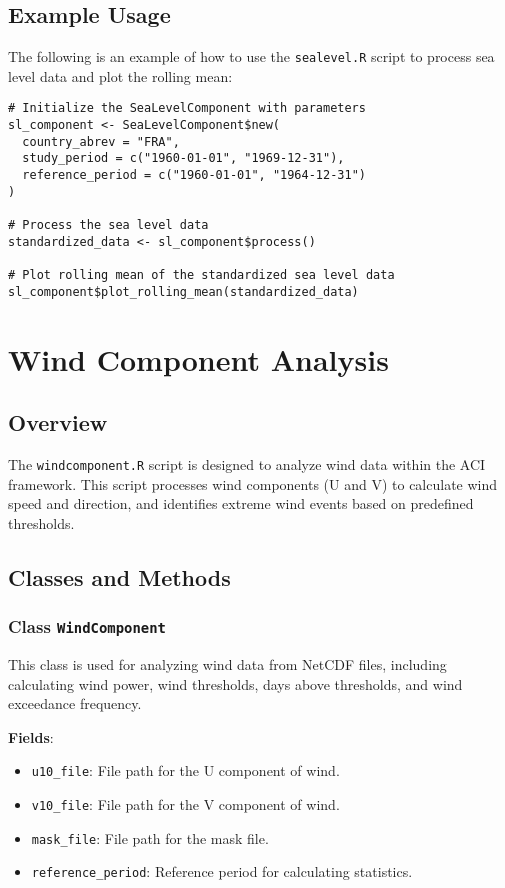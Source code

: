 \documentclass[a4paper,12pt]{article}
\begin{document}
\subsection{Example Usage}
The following is an example of how to use the \texttt{sealevel.R} script to process sea level data and plot the rolling mean:

\begin{verbatim}
# Initialize the SeaLevelComponent with parameters
sl_component <- SeaLevelComponent$new(
  country_abrev = "FRA",
  study_period = c("1960-01-01", "1969-12-31"),
  reference_period = c("1960-01-01", "1964-12-31")
)

# Process the sea level data
standardized_data <- sl_component$process()

# Plot rolling mean of the standardized sea level data
sl_component$plot_rolling_mean(standardized_data)
\end{verbatim}

\section{Wind Component Analysis}
\label{sec:windcomponent}

\subsection{Overview}
The \texttt{windcomponent.R} script is designed to analyze wind data within the ACI framework. This script processes wind components (U and V) to calculate wind speed and direction, and identifies extreme wind events based on predefined thresholds.

\subsection{Classes and Methods}

\subsubsection{Class \texttt{WindComponent}}
This class is used for analyzing wind data from NetCDF files, including calculating wind power, wind thresholds, days above thresholds, and wind exceedance frequency.

\textbf{Fields}:
\begin{itemize}
    \item \texttt{u10\_file}: File path for the U component of wind.
    \item \texttt{v10\_file}: File path for the V component of wind.
    \item \texttt{mask\_file}: File path for the mask file.
    \item \texttt{reference\_period}: Reference period for calculating statistics.
\end{itemize}
\end{document}
